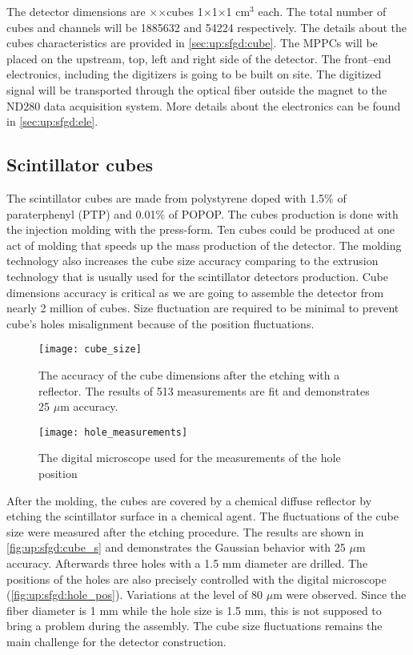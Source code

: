 \documentclass[main.tex]{subfiles}
\begin{document}
The detector dimensions are \sfgdx$\times$\sfgdy$\times$\sfgdz  cubes 1$\times$1$\times$1 $\text{cm}^3$ each. The total number of cubes and channels will be 1885632 and 54224 respectively. The details about the cubes characteristics are provided in \autoref{sec:up:sfgd:cube}. The MPPCs will be placed on the upstream, top, left and right side of the detector. The front--end electronics, including the digitizers is going to be built on site. The digitized signal will be transported through the optical fiber outside the magnet to the ND280 data acquisition system. More details about the electronics can be found in \autoref{sec:up:sfgd:ele}.

\subsection{Scintillator cubes}
\label{sec:up:sfgd:cube}
The scintillator cubes are made from polystyrene doped with 1.5\% of paraterphenyl (PTP) and 0.01\% of POPOP. The cubes production is done with the injection molding with the press-form. Ten cubes could be produced at one act of molding that speeds up the mass production of the detector. The molding technology also increases the cube size accuracy comparing to the extrusion technology that is usually used for the scintillator detectors production. Cube dimensions accuracy is critical as we are going to assemble the detector from nearly 2 million of cubes. Size fluctuation are required to be minimal to prevent cube's holes misalignment because of the position fluctuations.

\begin{figure}[!ht]
	\centering
	\begin{minipage}{0.49\linewidth}
		\centering
		\texttt{[image: cube\_size]}
		\caption{The accuracy of the cube dimensions after the etching with a reflector. The results of 513 measurements are fit and demonstrates 25 $\mu$m accuracy.}
		\label{fig:up:sfgd:cube_s}
	\end{minipage}
	\begin{minipage}{0.49\linewidth}
		\centering
		\texttt{[image: hole\_measurements]}
		\caption{The digital microscope used for the measurements of the hole position}
		\label{fig:up:sfgd:hole_pos}
	\end{minipage}
\end{figure}

After the molding, the cubes are covered by a chemical diffuse reflector by etching the scintillator surface in a chemical agent. The fluctuations of the cube size were measured after the etching procedure. The results are shown in \autoref{fig:up:sfgd:cube_s} and demonstrates the Gaussian behavior with 25 $\mu$m accuracy. Afterwards three holes with a 1.5 mm diameter are drilled. The positions of the holes are also precisely controlled with the digital microscope (\autoref{fig:up:sfgd:hole_pos}). Variations at the level of 80 $\mu$m were observed. Since the fiber diameter is 1 mm while the hole size is 1.5 mm, this is not supposed to bring a problem during the assembly. The cube size fluctuations remains the main challenge for the detector construction.
\end{document}

